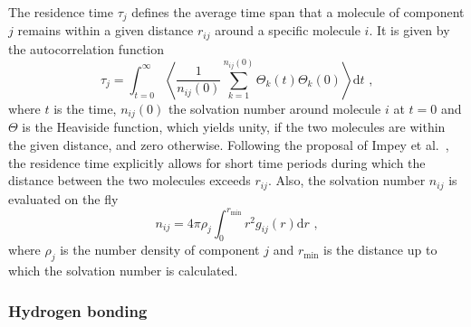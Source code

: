The residence time $\tau_{j}$ defines the average time span that a molecule of component $j$ remains within a given distance $r_{ij}$ around a specific molecule $i$. It is given by the autocorrelation function
\begin{equation}
\tau_{j} = \int_{t=0}^{\infty} \left\langle \frac{1}{n_{ij}(0)} \sum_{k=1}^{n_{ij}(0)}\Theta_k(t)\Theta_k(0)  \right\rangle \mathrm{d}t  \mbox{   ,}
\end{equation}
where $t$ is the time, $n_{ij}(0)$ the solvation number around molecule $i$ at $t=0$ and $\Theta$ is the Heaviside function, which yields unity, if the two molecules are within the given distance, and zero otherwise. 
Following the proposal of Impey et al.~\cite{Impey1983}, the residence time explicitly allows for short time periods during which the distance between the two molecules exceeds $r_{ij}$. Also, the solvation number $n_{ij}$ is evaluated on the fly 
\begin{equation}
n_{ij} = 4\pi \rho_{j} \int_0^{r_{\mathrm{min}}} r^2g_{ij}(r) \mathrm{d}r \mbox{   ,}
\end{equation}
where $\rho_{j}$ is the number density of component $j$ and $r_{\mathrm{min}}$ is the distance up to which the solvation number is calculated. 



\subsubsection{Hydrogen bonding}
\label{sec:Hydrogen bonding}

